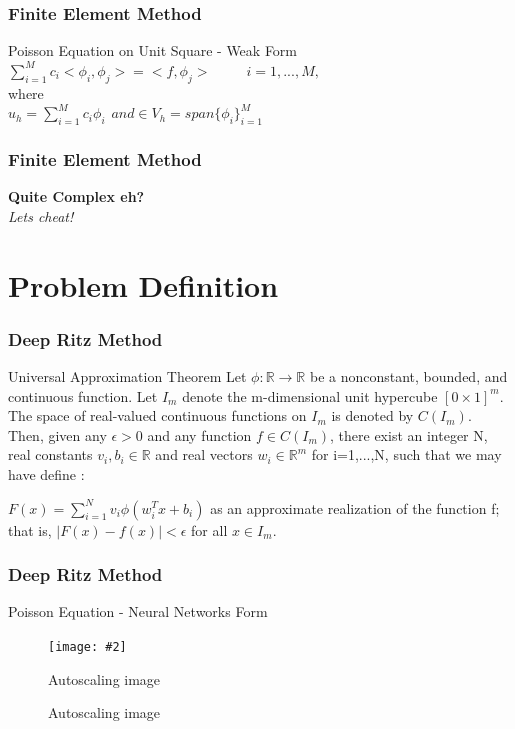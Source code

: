 \documentclass{beamer}
\makeatletter
\newcommand{\R}{\mathbb{R}}
\newcommand{\fitimage}[2][\@nil]{
	\begin{figure}
		\begin{adjustbox}{width=0.9\textwidth, totalheight=\textheight-2\baselineskip-2\baselineskip,keepaspectratio}
			\texttt{[image: \#2]}
		\end{adjustbox}
		\def\tmp{#1}%
		\ifx\tmp\@nnil
		\else
		\caption{#1}
		\fi
	\end{figure}
}
\makeatother
\begin{document}
\begin{frame}
	\frametitle{Finite Element Method}	
	\begin{block}{Poisson Equation on Unit Square - Weak Form}		
		$\sum_{i=1}^{M} c_i <\phi_i,\phi_j> = <f,\phi_j> \hspace{30pt} i=1,...,M,$		
		\\where\\	
		 $u_h = \sum_{i=1}^{M} c_i \phi_i \hspace{5pt} and \in V_h=span\{\phi_i\}_{i=1}^{M}$		
	\end{block}	
\end{frame}

\begin{frame}
	\frametitle{Finite Element Method}
	
	\textbf{Quite Complex eh?}\centering\\
	\textit{Lets cheat!}\centering\\
	
\end{frame}

\section{Problem Definition}
\begin{frame}
	\frametitle{Deep Ritz Method}
	
	\begin{block}{Universal Approximation Theorem}
		Let $\phi:\R \to \R$ be a nonconstant, bounded, and continuous function. Let $I_m$ denote the m-dimensional unit hypercube $[0 \times 1]^m$. The space of real-valued continuous functions on $I_m$ is denoted by $C(I_m)$. Then, given any $\epsilon >0$ and any function $f \in C(I_m)$, there exist an integer N, real constants $v_i, b_i \in \R$ and real vectors $w_i \in \R^m$ for i=1,...,N, such that we may have define :
		
		$F(x) = \sum_{i=1}^{N} v_i \phi(w_{i}^{T}x + b_i)$
		as an approximate realization of the function f; that is,
		$|F(x)-f(x)| < \epsilon$
		for all $x\in I_m$. 		
	\end{block}	
\end{frame}

\begin{frame}
	\frametitle{Deep Ritz Method}
	
	\begin{block}{Poisson Equation - Neural Networks Form}
		\fitimage[Autoscaling image]{DRM.png}
	\end{block}	

\end{frame}
\end{document}
